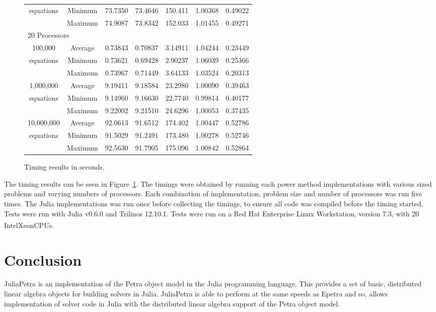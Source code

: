 \documentclass[acmsmall]{acmart}
\let\oldtextregister\textregistered
\renewcommand{\textregistered}{\textsuperscript{\tiny\oldtextregister}}
\begin{document}
\begin{figure}
\begin{tabular}{|c c|r|r|r||r|r|}
		equations		&Minimum & 73.7350 & 73.4646 & 150.411 & 1.00368 & 0.49022 \\
						&Maximum & 74.9087 & 73.8342 & 152.033 & 1.01455 & 0.49271 \\
	\hline
			\multicolumn{7}{|l|}{20 Processors}\\
	\hline
		100,000			&Average & 0.73843 & 0.70837 & 3.14911 & 1.04244 & 0.23449 \\
		equations		&Minimum & 0.73621 & 0.69428 & 2.90237 & 1.06039 & 0.25366 \\
						&Maximum & 0.73967 & 0.71449 & 3.64133 & 1.03524 & 0.20313 \\
	\hline
		1,000,000		&Average & 9.19411 & 9.18584 & 23.2980 & 1.00090 & 0.39463 \\
		equations		&Minimum & 9.14960 & 9.16630 & 22.7740 & 0.99814 & 0.40177 \\
						&Maximum & 9.22002 & 9.21510 & 24.6296 & 1.00053 & 0.37435 \\
	\hline
		10,000,000		&Average & 92.0613 & 91.6512 & 174.402 & 1.00447 & 0.52786 \\
		equations		&Minimum & 91.5029 & 91.2491 & 173.480 & 1.00278 & 0.52746 \\
						&Maximum & 92.5630 & 91.7905 & 175.096 & 1.00842 & 0.52864 \\
	\hline
\end{tabular}

\caption{Timing results in seconds.}
\label{fig:timing-results}
\end{figure}

The timing results can be seen in Figure~\ref{fig:timing-results}.
The timings were obtained by running each power method implementations
with various sized problems and varying numbers of processors.
Each combination of implementation, problem size and number of processors was run five times.
The Julia implementations was run once before collecting the timings, to ensure all code was
compiled before the timing started.
Tests were run with Julia v0.6.0 and Trilinos 12.10.1.
Tests were run on a Red Hat Enterprise Linux Workstation, version 7.3,
with 20 Intel\textregistered Xeon\textregistered CPUs.


\section{Conclusion}

JuliaPetra is an implementation of the Petra object model in the Julia programming language.
This provides a set of basic, distributed linear algebra objects for building solvers in Julia.
JuliaPetra is able to perform at the same speeds as Epetra and so, allows implementation of
solver code in Julia with the distributed linear algebra support of the Petra object model.



\end{document}
